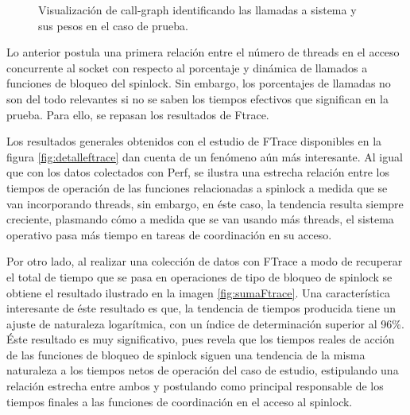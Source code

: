 \begin{figure}[]
{		\label{fig:callgraph4}
	}
	\caption{Visualización de call-graph identificando las llamadas a sistema y sus pesos en el caso de prueba.}
	\label{fig:callgraph}
	\hspace*{\fill}
\end{figure}

Lo anterior postula una primera relación entre el número de threads en el acceso concurrente al socket con respecto al porcentaje y dinámica de llamados a funciones de bloqueo del spinlock. Sin embargo, los porcentajes de llamadas no son del todo relevantes si no se saben los tiempos efectivos que significan en la prueba. Para ello, se repasan los resultados de Ftrace.

Los resultados generales obtenidos con el estudio de FTrace disponibles en la figura \ref{fig:detalleftrace} dan cuenta de un fenómeno aún más interesante. Al igual que con los datos colectados con Perf, se ilustra una estrecha relación entre los tiempos de operación de las funciones relacionadas a spinlock a medida que se van incorporando threads, sin embargo, en éste caso, la tendencia resulta siempre creciente, plasmando cómo a medida que se van usando más threads, el sistema operativo pasa más tiempo en tareas de coordinación en su acceso.

Por otro lado, al realizar una colección de datos con FTrace a modo de recuperar el total de tiempo que se pasa en operaciones de tipo de bloqueo de spinlock se obtiene el resultado ilustrado en la imagen \ref{fig:sumaFtrace}. Una característica interesante de éste resultado es que, la tendencia de tiempos producida tiene un ajuste de naturaleza logarítmica, con un índice de determinación superior al 96\%. Éste resultado es muy significativo, pues revela que los tiempos reales de acción de las funciones de bloqueo de spinlock siguen una tendencia de la misma naturaleza a los tiempos netos de operación del caso de estudio, estipulando una relación estrecha entre ambos y postulando como principal responsable de los tiempos finales a las funciones de coordinación en el acceso al spinlock.

